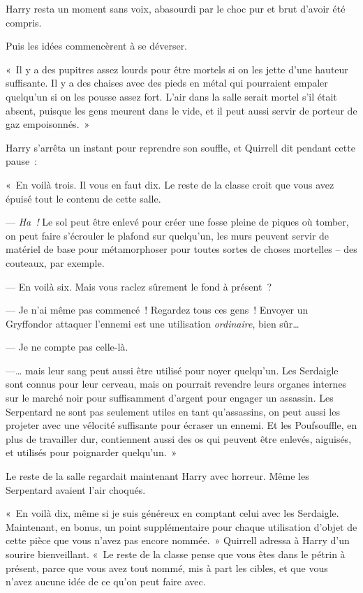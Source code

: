 Harry resta un moment sans voix, abasourdi par le choc pur et brut d'avoir été compris.

Puis les idées commencèrent à se déverser.

«~Il y a des pupitres assez lourds pour être mortels si on les jette d'une hauteur suffisante.
Il y a des chaises avec des pieds en métal qui pourraient empaler quelqu'un si on les pousse assez fort.
L'air dans la salle serait mortel s'il était absent, puisque les gens meurent dans le vide, et il peut aussi servir de porteur de gaz empoisonnés.~»

Harry s'arrêta un instant pour reprendre son souffle, et Quirrell dit pendant cette pause~:

«~En voilà trois.
Il vous en faut dix.
Le reste de la classe croit que vous avez épuisé tout le contenu de cette salle.

--- \emph{Ha~!} Le sol peut être enlevé pour créer une fosse pleine de piques où tomber, on peut faire s'écrouler le plafond sur quelqu'un, les murs peuvent servir de matériel de base pour métamorphoser pour toutes sortes de choses mortelles -- des couteaux, par exemple.

--- En voilà six. Mais vous raclez sûrement le fond à présent~?

--- Je n'ai même pas commencé~!
Regardez tous ces gens~!
Envoyer un Gryffondor attaquer l'ennemi est une utilisation \emph{ordinaire}, bien sûr…

--- Je ne compte pas celle-là.

---… mais leur sang peut aussi être utilisé pour noyer quelqu'un.
Les Serdaigle sont connus pour leur cerveau, mais on pourrait revendre leurs organes internes sur le marché noir pour suffisamment d'argent pour engager un assassin.
Les Serpentard ne sont pas seulement utiles en tant qu'assassins, on peut aussi les projeter avec une vélocité suffisante pour écraser un ennemi.
Et les Poufsouffle, en plus de travailler dur, contiennent aussi des os qui peuvent être enlevés, aiguisés, et utilisés pour poignarder quelqu'un.~»

Le reste de la salle regardait maintenant Harry avec horreur.
Même les Serpentard avaient l'air choqués.

«~En voilà dix, même si je suis généreux en comptant celui avec les Serdaigle.
Maintenant, en bonus, un point supplémentaire pour chaque utilisation d'objet de cette pièce que vous n'avez pas encore nommée.~»
Quirrell adressa à Harry d'un sourire bienveillant.
«~Le reste de la classe pense que vous êtes dans le pétrin à présent, parce que vous avez tout nommé, mis à part les cibles, et que vous n'avez aucune idée de ce qu'on peut faire avec.

